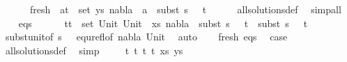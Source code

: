 \begin{isabellebody}
\ \ \ \ \ \ fresh{\isacharcolon}{\kern0pt}\ {\isachardoublequoteopen}{\isasymforall}\ {\isacharparenleft}{\kern0pt}a{\isacharcomma}{\kern0pt}t{\isacharparenright}{\kern0pt}\ {\isasymin}\ set\ ys{\isachardot}{\kern0pt}\ nabla{}\ {\isasymturnstile}\ a\ {\isasymsharp}\ subst\ {\isacharparenleft}{\kern0pt}s{}\ {\isasymbullet}\ {\isacharbrackleft}{\kern0pt}{\isacharbrackright}{\kern0pt}{\isacharparenright}{\kern0pt}\ t{\isachardoublequoteclose}\isanewline
\ \ \ \ \isamarkupfalse%
\ all{\isacharunderscore}{\kern0pt}solutions{\isacharunderscore}{\kern0pt}def\ \isamarkupfalse%
\ simp{\isacharunderscore}{\kern0pt}all\isanewline
\ \ \isamarkupfalse%
\ eqs{\isacharcolon}{\kern0pt}\ \isanewline
\ \ \ \ {\isachardoublequoteopen}{\isasymforall}\ {\isacharparenleft}{\kern0pt}t{}{\isacharcomma}{\kern0pt}t{}{\isacharparenright}{\kern0pt}\ {\isasymin}\ set\ {\isacharparenleft}{\kern0pt}{\isacharparenleft}{\kern0pt}Unit{\isacharcomma}{\kern0pt}\ Unit{\isacharparenright}{\kern0pt}\ {\isacharhash}{\kern0pt}\ xs{\isacharparenright}{\kern0pt}{\isachardot}{\kern0pt}\ nabla{}\ {\isasymturnstile}\ subst\ {\isacharparenleft}{\kern0pt}s{}\ {\isasymbullet}\ {\isacharbrackleft}{\kern0pt}{\isacharbrackright}{\kern0pt}{\isacharparenright}{\kern0pt}\ t{}\ {\isasymapprox}\ subst\ {\isacharparenleft}{\kern0pt}s{}\ {\isasymbullet}\ {\isacharbrackleft}{\kern0pt}{\isacharbrackright}{\kern0pt}{\isacharparenright}{\kern0pt}\ t{}{\isachardoublequoteclose}\isanewline
\ \ \ \ \isamarkupfalse%
\ subst{\isacharunderscore}{\kern0pt}unit{\isacharbrackleft}{\kern0pt}of\ {\isacartoucheopen}{\isacharparenleft}{\kern0pt}s{}\ {\isasymbullet}\ {\isacharbrackleft}{\kern0pt}{\isacharbrackright}{\kern0pt}{\isacharparenright}{\kern0pt}{\isacartoucheclose}{\isacharbrackright}{\kern0pt}\ equ{\isacharunderscore}{\kern0pt}refl{\isacharbrackleft}{\kern0pt}of\ nabla{}\ Unit{\isacharbrackright}{\kern0pt}\ \isamarkupfalse%
\ auto\isanewline
\ \ \isamarkupfalse%
\ fresh\ eqs\ \isamarkupfalse%
\ {\isacharquery}{\kern0pt}case\isanewline
\ \ \ \ \isamarkupfalse%
\ all{\isacharunderscore}{\kern0pt}solutions{\isacharunderscore}{\kern0pt}def\ \isamarkupfalse%
\ simp\isanewline
{}\isamarkupfalse%
\isanewline
\ \ \isamarkupfalse%
\ {\isacharparenleft}{\kern0pt}{}\ t{}\ t{}\ t{}\ t{}\ xs\ ys{\isacharparenright}{\kern0pt}\isanewline

\end{isabellebody}

